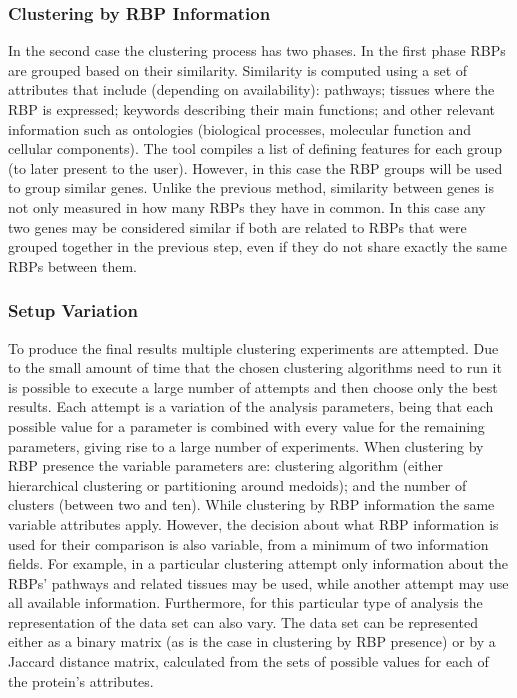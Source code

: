 \subsubsection*{Clustering by RBP Information}

In the second case the clustering process has two phases. In the first phase
RBPs are grouped based on their similarity. Similarity is computed using a set
of attributes that include (depending on availability): pathways; tissues where
the RBP is expressed; keywords describing their main functions; and other
relevant information such as ontologies (biological processes, molecular
function and cellular components). The tool compiles a list of defining features
for each group (to later present to the user). However, in this case the RBP
groups will be used to group similar genes. Unlike the previous method,
similarity between genes is not only measured in how many RBPs they have in
common. In this case any two genes may be considered similar if both are related
to RBPs that were grouped together in the previous step, even if they do not
share exactly the same RBPs between them.

\subsubsection*{Setup Variation}

To produce the final results multiple clustering experiments are attempted. Due
to the small amount of time that the chosen clustering algorithms need to run it
is possible to execute a large number of attempts and then choose only the best
results. Each attempt is a variation of the analysis parameters, being that each
possible value for a parameter is combined with every value for the remaining
parameters, giving rise to a large number of experiments. When clustering by RBP
presence the variable parameters are: clustering algorithm (either hierarchical
clustering or partitioning around medoids); and the number of clusters (between
two and ten). While clustering by RBP information the same variable attributes
apply. However, the decision about what RBP information is used for their
comparison is also variable, from a minimum of two information fields. For
example, in a particular clustering attempt only information about the RBPs'
pathways and related tissues may be used, while another attempt may use all
available information. Furthermore, for this particular type of analysis the
representation of the data set can also vary. The data set can be represented
either as a binary matrix (as is the case in clustering by RBP presence) or by a
Jaccard distance matrix, calculated from the sets of possible values for each of
the protein's attributes.

